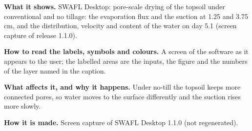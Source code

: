 \textbf{What it shows.} SWAFL Desktop: pore-scale drying of the topsoil under conventional and no tillage: the evaporation flux and the suction at 1.25 and 3.75\,cm, and the distribution, velocity and content of the water on day 5.1 (screen capture of release 1.1.0).

\textbf{How to read the labels, symbols and colours.} A screen of the software as it appears to the user; the labelled areas are the inputs, the figure and the numbers of the layer named in the caption.

\textbf{What affects it, and why it happens.} Under no-till the topsoil keeps more connected pores, so water moves to the surface differently and the suction rises more slowly. 

\textbf{How it is made.} Screen capture of SWAFL Desktop 1.1.0 (not regenerated).
